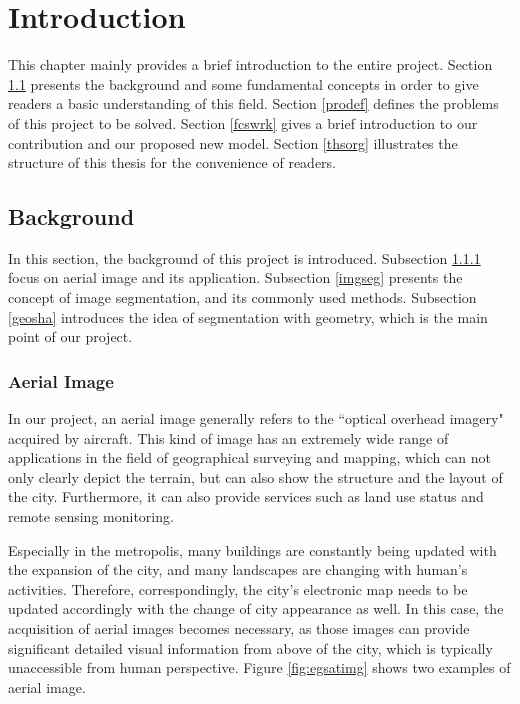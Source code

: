 \chapter{Introduction}
This chapter mainly provides a brief introduction to the entire project. Section \ref{bckgrd} presents the background and some fundamental concepts in order to give readers a basic understanding of this field. Section \ref{prodef} defines the problems of this project to be solved. Section \ref{fcswrk} gives a brief introduction to our contribution and our proposed new model. Section \ref{thsorg} illustrates the structure of this thesis for the convenience of readers.

\section{Background}\label{bckgrd}
In this section, the background of this project is introduced. Subsection \ref{arlimg} focus on aerial image and its application. Subsection \ref{imgseg} presents the concept of image segmentation, and its commonly used methods. Subsection \ref{geosha} introduces the idea of segmentation with geometry, which is  the main point of our project.

\subsection{Aerial Image}\label{arlimg}
In our project, an aerial image generally refers to the ``optical overhead imagery" \cite{mspascal} acquired by aircraft. This kind of image has an extremely wide range of applications in the field of geographical surveying and mapping, which can not only clearly depict the terrain, but can also show the structure and the layout of the city. Furthermore, it can also provide services such as land use status and remote sensing monitoring.

Especially in the metropolis, many buildings are constantly being updated with the expansion of the city, and many landscapes are changing with human's activities. Therefore, correspondingly, the city's electronic map needs to be updated accordingly with the change of city appearance as well. In this case, the acquisition of aerial images becomes necessary, as those images can provide significant detailed visual information from above of the city, which is typically unaccessible from human perspective. Figure \ref{fig:egsatimg} shows two examples of aerial image.



